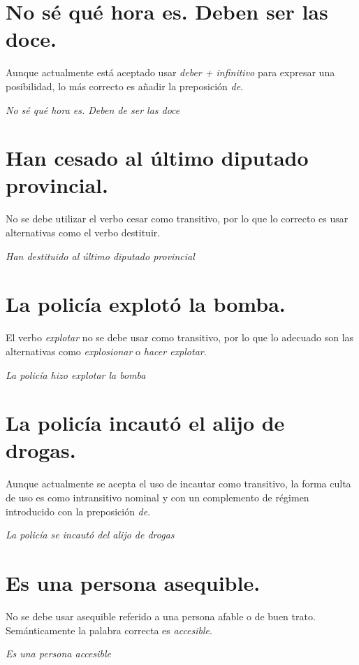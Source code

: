 \documentclass[12pt, a4paper, oneside]{report}
\begin{document}
        \section{No sé qué hora es. \color{rojo}Deben\color{negro} \;ser las doce.}
        Aunque actualmente está aceptado usar \emph{deber + infinitivo} para expresar una posibilidad, lo más
        correcto es añadir la preposición \emph{de}.
        \begin{center}
            \textit{No sé qué hora es. \color{verde}Deben de\color{negro} \;ser las doce}
        \end{center}

        \section{Han \color{rojo}cesado\color{negro} \;al último diputado provincial.}
        No se debe utilizar el verbo cesar como transitivo, por lo que lo correcto es usar alternativas como
        el verbo destituir.
        \begin{center}
            \textit{Han \color{verde}destituido\color{negro} \;al último diputado provincial}
        \end{center}
        \clearpage

        \section{La policía \color{rojo}explotó\color{negro} \;la bomba.}
        El verbo \emph{explotar} no se debe usar como transitivo, por lo que lo adecuado son las alternativas
        como \emph{explosionar} o \emph{hacer explotar}.
        \begin{center}
            \textit{La policía \color{verde}hizo explotar\color{negro} \;la bomba}
        \end{center}

        \section{La policía \color{rojo}incautó\color{negro} \;el alijo de drogas.}
        Aunque actualmente se acepta el uso de incautar como transitivo, la forma culta de uso es como
        intransitivo nominal y con un complemento de régimen introducido con la preposición \emph{de}.
        \begin{center}
            \textit{La policía \color{verde}se incautó del\color{negro} \;alijo de drogas}
        \end{center}

        \section{Es una persona \color{rojo}asequible\color{negro}.}
        No se debe usar asequible referido a una persona afable o de buen trato. Semánticamente la palabra
        correcta es \emph{accesible}.
        \begin{center}
            \textit{Es una persona \color{verde}accesible\color{negro}}
        \end{center}
\end{document}
